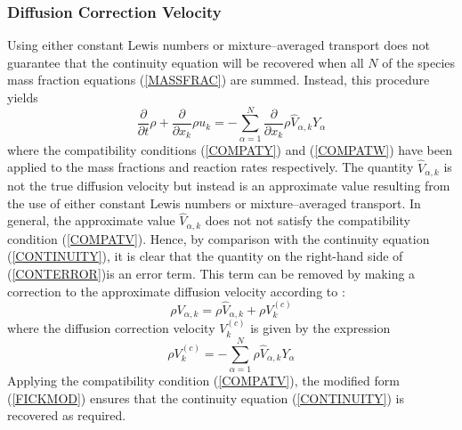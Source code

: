 \documentclass[dvips]{article}
\begin{document}
\subsubsection{Diffusion Correction Velocity}
Using either constant Lewis numbers or mixture--averaged transport does not
guarantee that the 
continuity equation will be recovered when all $N$ of the species mass
fraction equations (\ref{MASSFRAC}) are summed.  Instead, this procedure yields
\begin{equation}
\frac{\partial}{\partial t}\rho +
\frac{\partial}{\partial x_{k}}\rho u_{k} =
-\sum_{\alpha=1}^{N} \frac{\partial}{\partial x_{k}}
\rho \hat{V}_{\alpha,k} Y_{\alpha}
\label{CONTERROR}
\end{equation}
where the compatibility conditions (\ref{COMPATY}) and (\ref{COMPATW})
have been applied to the mass fractions and reaction rates respectively.
The quantity $\hat{V}_{\alpha,k}$ is not the true diffusion velocity but
instead is an approximate value resulting from the use of either constant
Lewis numbers or mixture--averaged transport.  In general, the approximate
value $\hat{V}_{\alpha,k}$ does not not satisfy the compatibility condition
(\ref{COMPATV}).  Hence, by comparison with the continuity equation
(\ref{CONTINUITY}), it is clear that
the quantity on the right-hand side of (\ref{CONTERROR})is an error term.
This term can be
removed by making a correction to the approximate diffusion velocity
according to \cite{ErnGiovangigli}:
\begin{equation}
\rho V_{\alpha,k} = \rho \hat{V}_{\alpha,k} + \rho V^{(c)}_{k}
\label{FICKMOD}
\end{equation}
where the diffusion correction velocity $V^{(c)}_{k}$ is given by the
expression
\begin{equation}
\rho V^{(c)}_{k} =
-\sum_{\alpha=1}^{N} \rho \hat{V}_{\alpha,k} Y_{\alpha}
\end{equation}
Applying the compatibility condition (\ref{COMPATV}), the modified form
(\ref{FICKMOD}) ensures that the
continuity equation (\ref{CONTINUITY}) is recovered as required.
\end{document}
